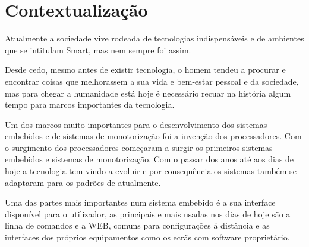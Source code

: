 \section{Contextualização}
\par
Atualmente a sociedade vive rodeada de tecnologias indispensáveis e de ambientes que se intitulam Smart, mas nem sempre foi assim.\par
Desde cedo, mesmo antes de existir tecnologia, o homem tendeu a procurar e encontrar coisas que melhorassem a sua vida e bem-estar pessoal e da sociedade, mas para chegar a humanidade está hoje é necessário recuar na história algum tempo para marcos importantes da tecnologia.\par
Um dos marcos muito importantes para o desenvolvimento dos sistemas embebidos e de sistemas de monotorização foi a invenção dos processadores. Com o surgimento dos processadores começaram a surgir os primeiros sistemas embebidos e sistemas de monotorização. Com o passar dos anos até aos dias de hoje a tecnologia tem vindo a evoluir e por consequência os sistemas também se adaptaram para os padrões de atualmente.\par
Uma das partes mais importantes num sistema embebido é a sua interface disponível para o utilizador, as principais e mais usadas nos dias de hoje são a linha de comandos e a WEB, comuns para configurações á distância e as interfaces dos próprios equipamentos como os ecrãs com software proprietário.


